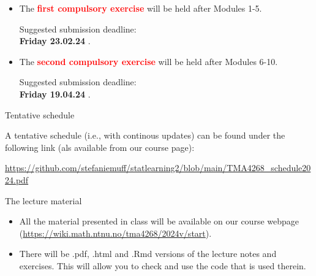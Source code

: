 \documentclass[
  10pt,
  ignorenonframetext,
]{beamer}
\providecommand{\tightlist}{%
  \setlength{\itemsep}{0pt}\setlength{\parskip}{0pt}}
\begin{document}
\begin{frame}
\begin{itemize}
\item
  The \textbf{\textcolor{red}{first compulsory exercise}} will be held
  after Modules 1-5.

  \hspace{8mm}

  Suggested submission deadline:\\
  \vspace{2mm} \hspace{8mm} \textbf{Friday 23.02.24 }.
\end{itemize}

\vspace{8mm}

\begin{itemize}
\item
  The \textbf{\textcolor{red}{second compulsory exercise}} will be held
  after Modules 6-10.

  \hspace{8mm}

  Suggested submission deadline:\\
  \vspace{2mm} \hspace{8mm}\textbf{Friday 19.04.24 }.
\end{itemize}
\end{frame}

\begin{frame}
\begin{block}{Tentative schedule}
\protect\hypertarget{tentative-schedule}{}
\(~\)

A tentative schedule (i.e., with continous updates) can be found under
the following link (als available from our course page):

\vspace{2mm}

\url{https://github.com/stefaniemuff/statlearning2/blob/main/TMA4268_schedule2024.pdf}
\end{block}
\end{frame}

\begin{frame}
\begin{block}{The lecture material}
\protect\hypertarget{the-lecture-material}{}
\(~\)

\begin{itemize}
\tightlist
\item
  All the material presented in class will be available on our course
  webpage (\url{https://wiki.math.ntnu.no/tma4268/2024v/start}).
\end{itemize}

\vspace{2mm}

\begin{itemize}
\tightlist
\item
  There will be .pdf, .html and .Rmd versions of the lecture notes and
  exercises. This will allow you to check and use the code that is used
  therein.
\end{itemize}
\end{block}
\end{frame}
\end{document}
